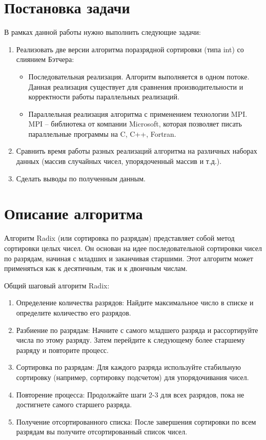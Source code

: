 \documentclass{report}
\begin{document}
\section*{Постановка задачи}
\par В рамках данной работы нужно выполнить следующие задачи:
\begin{enumerate}
    \item Реализовать две версии алгоритма поразрядной сортировки (типа int) со слиянием Бэтчера:
    \begin{itemize}
    \item Последовательная реализация. Алгоритм выполняется в одном потоке. Данная реализация существует для сравнения производительности и корректности работы параллельных реализаций.
    \item Параллельная реализация алгоритма с применением технологии MPI. MPI -- библиотека от компании Microsoft, которая позволяет писать параллельные программы на C, C++, Fortran.
    \end{itemize}
    \item Сравнить время работы разных реализаций алгоритма на различных наборах данных (массив случайных чисел, упорядоченный массив и т.д.).
    \item Сделать выводы по полученным данным.
\end{enumerate}
\newpage

\section*{Описание алгоритма}
\par Алгоритм Radix (или сортировка по разрядам) представляет собой метод сортировки целых чисел. Он основан на идее последовательной сортировки чисел по разрядам, начиная с младших и заканчивая старшими. Этот алгоритм может применяться как к десятичным, так и к двоичным числам.

\par Общий шаговый алгоритм Radix:

\begin{enumerate}
    \item Определение количества разрядов: Найдите максимальное число в списке и определите количество его разрядов.
    \item Разбиение по разрядам: Начните с самого младшего разряда и рассортируйте числа по этому разряду. Затем перейдите к следующему более старшему разряду и повторите процесс.
    \item Сортировка по разрядам: Для каждого разряда используйте стабильную сортировку (например, сортировку подсчетом) для упорядочивания чисел.
    \item Повторение процесса: Продолжайте шаги 2-3 для всех разрядов, пока не достигнете самого старшего разряда.
    \item Получение отсортированного списка: После завершения сортировки по всем разрядам вы получите отсортированный список чисел.
\end{enumerate}
\end{document}
